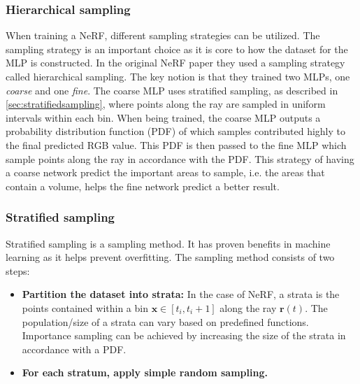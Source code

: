 \subsubsection{Hierarchical sampling} \label{sec:hierarchicalsampling}
When training a NeRF, different sampling strategies can be utilized. The sampling strategy is an important choice as it is core to how the dataset for the MLP is constructed. In the original NeRF paper they used a sampling strategy called hierarchical sampling. The key notion is that they trained two MLPs, one \textit{coarse} and one \textit{fine}. The coarse MLP uses stratified sampling, as described in \autoref{sec:stratifiedsampling}, where points along the ray are sampled in uniform intervals within each bin. When being trained, the coarse MLP outputs a probability distribution function (PDF) of which samples contributed highly to the final predicted RGB value. This PDF is then passed to the fine MLP which sample points along the ray in accordance with the PDF. This strategy of having a coarse network predict the important areas to sample, i.e. the areas that contain a volume, helps the fine network predict a better result.


\subsubsection{Stratified sampling} \label{sec:stratifiedsampling}
Stratified sampling is a sampling method. It has proven benefits in machine learning as it helps prevent overfitting. The sampling method consists of two steps:

\begin{itemize}
    \item \textbf{Partition the dataset into strata:} In the case of NeRF, a strata is the points contained within a bin $\pmb{x} \in [t_i, t_i+1]$ along the ray $\pmb{r}(t)$. The population/size of a strata can vary based on predefined functions. Importance sampling can be achieved by increasing the size of the strata in accordance with a PDF.
    \item \textbf{For each stratum, apply simple random sampling.} 
\end{itemize}




